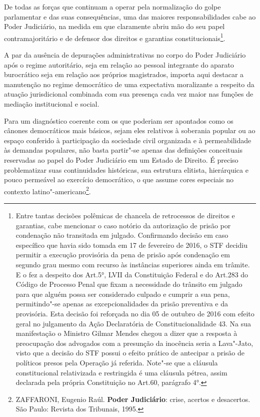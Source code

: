 De todas as forças que continuam a operar pela normalização do golpe
parlamentar e das suas consequências, uma das maiores responsabilidades
cabe ao Poder Judiciário, na medida em que claramente abriu mão do seu
papel contramajoritário e de defensor dos direitos e garantias
constitucionais\footnote{Entre tantas decisões polêmicas de chancela de
  retrocessos de direitos e garantias, cabe mencionar o caso notório da
  autorização de prisão por condenação não transitada em julgado.
  Confirmando decisão em caso específico que havia sido tomada em 17 de
  fevereiro de 2016, o STF decidiu permitir a execução provisória da
  pena de prisão após condenação em segundo grau mesmo com recurso às
  instâncias superiores ainda em trâmite. E o fez a despeito dos Art.5°,
  LVII da Constituição Federal e do Art.283 do Código de Processo Penal
  que fixam a necessidade do trânsito em julgado para que alguém possa
  ser considerado culpado e cumprir a sua pena, permitindo"-se apenas as
  excepcionalidades da prisão preventiva e da provisória. Esta decisão
  foi reforçada no dia 05 de outubro de 2016 com efeito geral no
  julgamento da Ação Declaratória de Constitucionalidade 43. Na sua
  manifestação o Ministro Gilmar Mendes chegou a dizer que a resposta à
  preocupação dos advogados com a presunção da inocência seria a
  Lava"-Jato, visto que a decisão do STF possui o efeito prático de
  antecipar a prisão de políticos presos pela Operação já referida.
  Note"-se que a cláusula constitucional relativizada e restringida é uma
  cláusula pétrea, assim declarada pela própria Constituição no Art.60,
  parágrafo 4°.}.

A par da ausência de depurações administrativas no corpo do Poder
Judiciário após o regime autoritário, seja em relação ao pessoal
integrante do aparato burocrático seja em relação aos próprios
magistrados, importa aqui destacar a manutenção no regime democrático de
uma expectativa moralizante a respeito da atuação jurisdicional
combinada com sua presença cada vez maior nas funções de mediação
institucional e social.

Para um diagnóstico coerente com os que poderiam ser apontados como os
cânones democráticos mais básicos, sejam eles relativos à soberania
popular ou ao espaço conferido à participação da sociedade civil
organizada e à permeabilidade às demandas populares, não basta partir"-se
apenas das definições conceituais reservadas ao papel do Poder
Judiciário em um Estado de Direito. É preciso problematizar suas
continuidades históricas, sua estrutura elitista, hierárquica e pouco
permeável ao exercício democrático, o que assume cores especiais no
contexto latino"-americano\footnote{ZAFFARONI, Eugenio Raúl.
  \textbf{Poder Judiciário}: crise, acertos e desacertos. São Paulo:
  Revista dos Tribunais, 1995.}.

